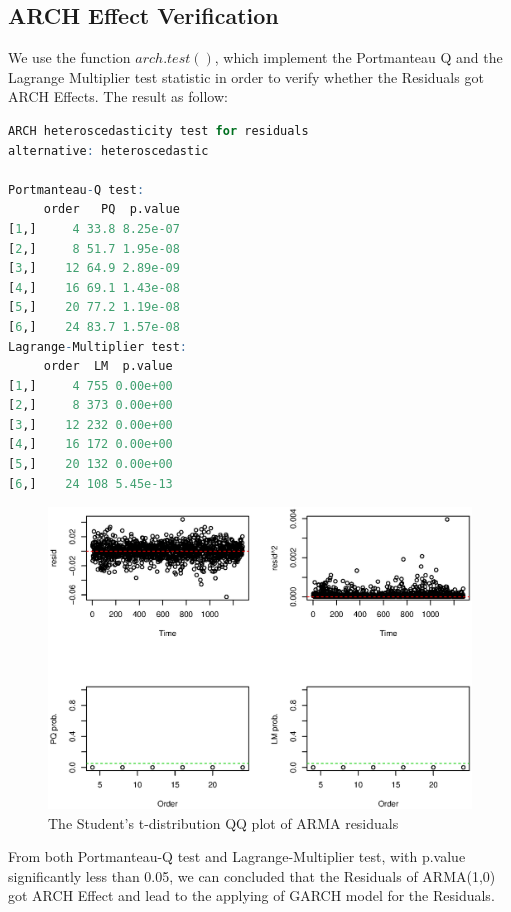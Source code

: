 \subsection{ARCH Effect Verification}
We use the function $arch.test()$, which implement the Portmanteau Q and the Lagrange Multiplier test statistic \cite{mcleod1983diagnostic,engle1982autoregressive} in order to verify whether the Residuals got ARCH Effects. The result as follow:
\begin{lstlisting}[language=R, caption=ARCH Heteroscedasticity test for residuals]
ARCH heteroscedasticity test for residuals 
alternative: heteroscedastic 

Portmanteau-Q test: 
     order   PQ  p.value
[1,]     4 33.8 8.25e-07
[2,]     8 51.7 1.95e-08
[3,]    12 64.9 2.89e-09
[4,]    16 69.1 1.43e-08
[5,]    20 77.2 1.19e-08
[6,]    24 83.7 1.57e-08
Lagrange-Multiplier test: 
     order  LM  p.value
[1,]     4 755 0.00e+00
[2,]     8 373 0.00e+00
[3,]    12 232 0.00e+00
[4,]    16 172 0.00e+00
[5,]    20 132 0.00e+00
[6,]    24 108 5.45e-13
\end{lstlisting}
\FloatBarrier
\begin{figure}[!htbp]
  \centering
  \includegraphics[width=\textwidth]{img/Fig14.eps}
  \caption{The Student's t-distribution QQ plot of ARMA residuals}
\end{figure}
\FloatBarrier

From both Portmanteau-Q test and Lagrange-Multiplier test, with p.value significantly less than 0.05, we can concluded that the Residuals of ARMA(1,0) got ARCH Effect and lead to the applying of GARCH model for the Residuals. 